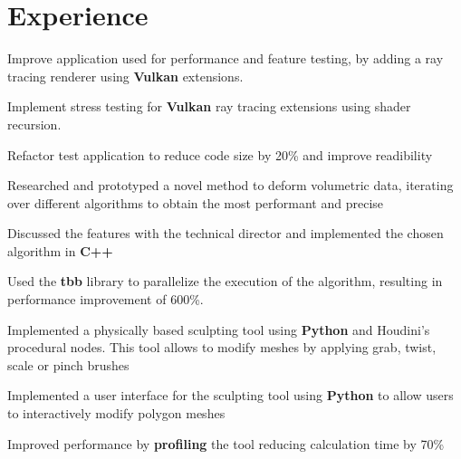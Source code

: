 \documentclass[]{deedy-resume-openfont}
\begin{document}
\begin{minipage}[t]{0.66\textwidth} 


\section{Experience}
\vspace{\topsep} %
\begin{tightemize}
    \item Improve application used for performance and feature testing, by adding a ray tracing renderer using \textbf{Vulkan} extensions.
    \item Implement stress testing for \textbf{Vulkan} ray tracing extensions using shader recursion. 
    \item Refactor test application to reduce code size by 20\% and improve readibility
\end{tightemize}
\sectionsep
{} 
\begin{tightemize}
    \item Researched and prototyped a novel method to deform volumetric data, iterating over different algorithms to obtain the most performant and precise
    \item Discussed the features with the technical director and implemented the chosen algorithm in \textbf{C++}
    \item Used  the \textbf{tbb} library to parallelize the execution of the algorithm, resulting in performance improvement of 600\%.
\end{tightemize}
\begin{tightemize}
    \item Implemented a physically based sculpting tool using \textbf{Python} and Houdini's procedural nodes. This tool allows to modify meshes by applying grab, twist, scale or pinch brushes
    \item Implemented a user interface for the sculpting tool using \textbf{Python} to allow users to interactively modify polygon meshes
    \item Improved performance by \textbf{profiling} the tool reducing calculation time by 70\%
\end{tightemize}
\sectionsep


\end{minipage}
\end{document}
